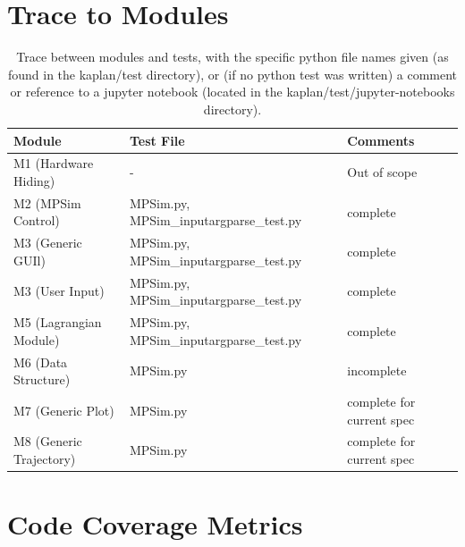 \documentclass[12pt, titlepage]{article}
\begin{document}
\section{Trace to Modules}		

\begin{table}[H]
\begin{center}

	\centering
	\begin{tabular}{p{} p{} p{}}
		\toprule
		\textbf{Module} & \textbf{Test File} & \textbf{Comments} \\
		\midrule
		M1 (Hardware Hiding) & - & Out of scope \\
		M2 (MPSim Control) & MPSim.py, MPSim\_inputargparse\_test.py  & complete \\
		M3 (Generic GUIl) & MPSim.py, MPSim\_inputargparse\_test.py  & complete \\
		M3 (User Input) & MPSim.py, MPSim\_inputargparse\_test.py  & complete \\
		M5 (Lagrangian Module) & MPSim.py, MPSim\_inputargparse\_test.py  & complete \\
		M6 (Data Structure) & MPSim.py & incomplete \\
		M7 (Generic Plot) & MPSim.py & complete for current spec \\
		M8 (Generic Trajectory) & MPSim.py & complete for current spec \\
		\bottomrule
	\end{tabular}
	\caption{Trace between modules and tests, with the specific python 
		file names given (as found in the kaplan/test directory), or (if no 
		python test was written) a comment or reference to a jupyter notebook 
		(located in the kaplan/test/jupyter-notebooks directory).}
	\label{trace-MT}

\end{center}
\end{table}	

\section{Code Coverage Metrics}
\end{document}
